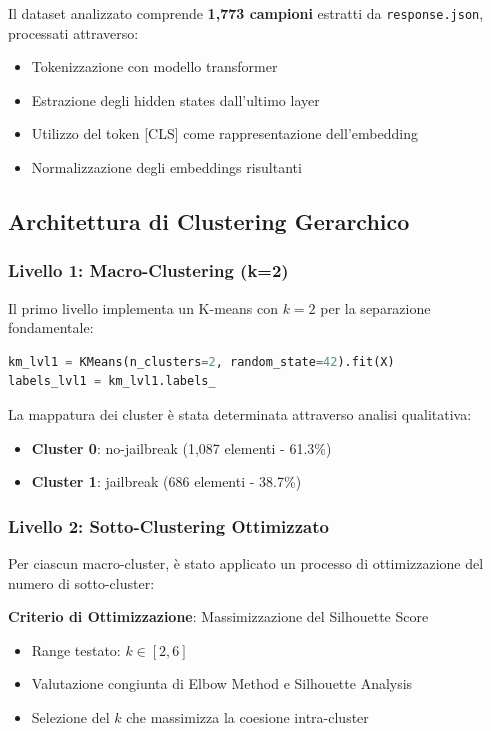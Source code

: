 \documentclass[12pt,a4paper]{article}
\begin{document}
Il dataset analizzato comprende \textbf{1,773 campioni} estratti da \texttt{response.json}, processati attraverso:
\begin{itemize}
    \item Tokenizzazione con modello transformer
    \item Estrazione degli hidden states dall'ultimo layer
    \item Utilizzo del token [CLS] come rappresentazione dell'embedding
    \item Normalizzazione degli embeddings risultanti
\end{itemize}

\subsection{Architettura di Clustering Gerarchico}

\subsubsection{Livello 1: Macro-Clustering (k=2)}
Il primo livello implementa un K-means con $k=2$ per la separazione fondamentale:

\begin{lstlisting}[language=Python]
km_lvl1 = KMeans(n_clusters=2, random_state=42).fit(X)
labels_lvl1 = km_lvl1.labels_
\end{lstlisting}

La mappatura dei cluster è stata determinata attraverso analisi qualitativa:
\begin{itemize}
    \item \textbf{Cluster 0}: no-jailbreak (1,087 elementi - 61.3\%)
    \item \textbf{Cluster 1}: jailbreak (686 elementi - 38.7\%)
\end{itemize}

\subsubsection{Livello 2: Sotto-Clustering Ottimizzato}
Per ciascun macro-cluster, è stato applicato un processo di ottimizzazione del numero di sotto-cluster:

\textbf{Criterio di Ottimizzazione}: Massimizzazione del Silhouette Score
\begin{itemize}
    \item Range testato: $k \in [2, 6]$
    \item Valutazione congiunta di Elbow Method e Silhouette Analysis
    \item Selezione del $k$ che massimizza la coesione intra-cluster
\end{itemize}
\end{document}
